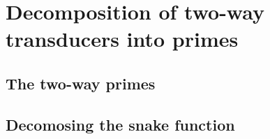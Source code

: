 \section{Decomposition of two-way transducers into primes}
\label{sec:2dfa-primes}

\subsection{The two-way primes}
\subsection{Decomosing the snake function}


